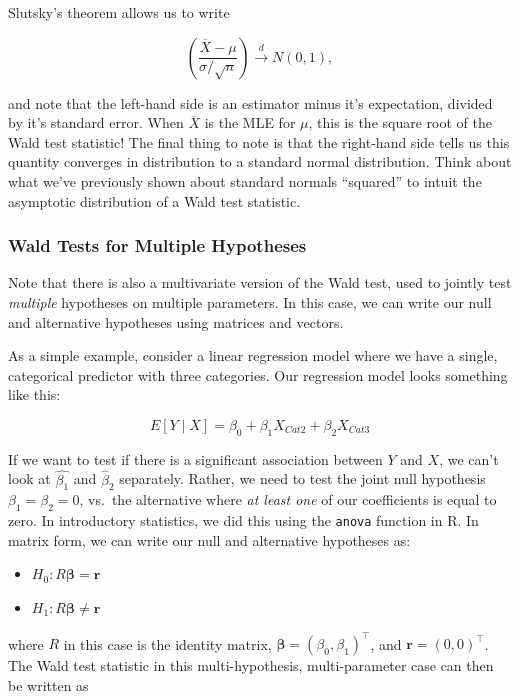 \documentclass[
  letterpaper,
  DIV=11,
  numbers=noendperiod]{scrreprt}
\begin{document}
Slutsky's theorem allows us to write

\[
\left( \frac{\overline{X} - \mu}{\sigma / \sqrt{n}}\right) \overset{d}{\to} N(0,1),
\]

and note that the left-hand side is an estimator minus it's expectation,
divided by it's standard error. When \(\overline{X}\) is the MLE for
\(\mu\), this is the square root of the Wald test statistic! The final
thing to note is that the right-hand side tells us this quantity
converges in distribution to a standard normal distribution. Think about
what we've previously shown about standard normals ``squared'' to intuit
the asymptotic distribution of a Wald test statistic.

\hypertarget{wald-tests-for-multiple-hypotheses}{%
\subsubsection*{Wald Tests for Multiple
Hypotheses}\label{wald-tests-for-multiple-hypotheses}}

Note that there is also a multivariate version of the Wald test, used to
jointly test \emph{multiple} hypotheses on multiple parameters. In this
case, we can write our null and alternative hypotheses using matrices
and vectors.

As a simple example, consider a linear regression model where we have a
single, categorical predictor with three categories. Our regression
model looks something like this:

\[
E[Y \mid X] = \beta_0 + \beta_1 X_{Cat2} + \beta_2 X_{Cat3}
\]

If we want to test if there is a significant association between \(Y\)
and \(X\), we can't look at \(\hat{\beta_1}\) and \(\hat{\beta}_2\)
separately. Rather, we need to test the joint null hypothesis
\(\beta_1 = \beta_2 = 0\), vs.~the alternative where \emph{at least one}
of our coefficients is equal to zero. In introductory statistics, we did
this using the \texttt{anova} function in R. In matrix form, we can
write our null and alternative hypotheses as:

\begin{itemize}
\item
  \(H_0: R \boldsymbol{\beta} = \textbf{r}\)
\item
  \(H_1: R \boldsymbol{\beta} \neq \textbf{r}\)
\end{itemize}

where \(R\) in this case is the identity matrix,
\(\boldsymbol{\beta} = (\beta_0, \beta_1)^\top\), and
\(\textbf{r} = (0,0)^\top\). The Wald test statistic in this
multi-hypothesis, multi-parameter case can then be written as
\end{document}
